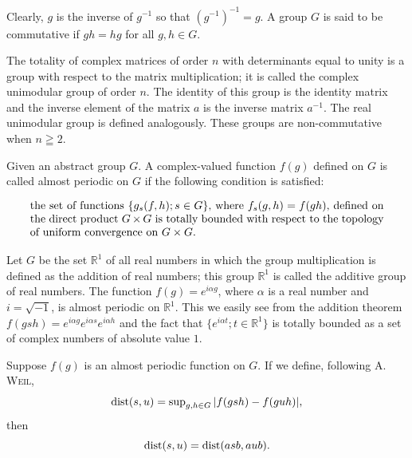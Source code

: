 Clearly, $g$ is the inverse of $g^{-1}$ so that $(g^{-1})^{-1} = g$. A group $G$ is said to be commutative if $gh = hg$ for all $g, h \in G$. 

\begin{examplen} The totality of complex matrices of order $n$ with determinants equal to unity is a group with respect to the matrix multiplication; it is called the complex unimodular group of order $n$. The identity of this group is the identity matrix and the inverse element of the matrix $a$ is the inverse matrix $a^{-1}$. The real unimodular group is defined analogously. These groups are non-commutative when $n \geqq 2$.

\end{examplen}
\begin{definition}\label{def:VIII.5.Definition.2} Given an abstract group $G$. A complex-valued function $f(g)$ defined on $G$ is called almost periodic on $G$ if the following condition is satisfied: 

\begin{equation}\label{eq:VIII.5.5}
\begin{minipage}[b]{0.92\linewidth}
the set of functions $\{g_s(f, h); s \in G\}$, where $f_s(g, h) = f(gh)$, defined on the direct product $G \times G$ is totally bounded with respect to the topology of uniform convergence on $G \times G$.
\end{minipage}
\end{equation}
\end{definition}


\begin{examplen} Let $G$ be the set $\mathbb{R}^{1}$ of all real numbers in which the group multiplication is defined as the addition of real numbers; this group $\mathbb{R}^{1}$ is called the additive group of real numbers. The function $f(g) = e^{i\alpha g}$, where $\alpha$ is a real number and $i = \sqrt{-1}$, is almost periodic on $\mathbb{R}^{1}$. This we easily see from the addition theorem $f(gsh) = e^{i\alpha g} e^{i\alpha s} e^{i\alpha h}$ and the fact that $\{e^{i\alpha t}; t \in \mathbb{R}^{1}\}$ is totally bounded as a set of complex numbers of absolute value $1$.

\end{examplen}
\begin{proposition}\label{prop:VIII.5.Proposition.1} Suppose $f(g)$ is an almost periodic function on $G$. If we define, following A. \textsc{Weil}, 
\begin{equation}\label{eq:VIII.5.6}
\operatorname{dist} (s, u) = \sup\nolimits _{g, h \in G} | f (g s h) - f (g u h) |,
\end{equation}
then 
\begin{equation}\label{eq:VIII.5.7}
\operatorname{dist} (s, u) = \operatorname{dist} (a s b, a u b).
\end{equation}
\end{proposition}

